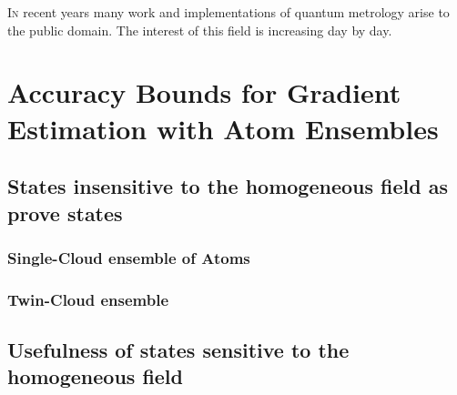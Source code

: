\documentclass[12pt, letterpaper, twoside]{article}
\begin{document}
\lettrine[lines=2, findent=3pt,nindent=0pt]{I}{n} recent years many work and
implementations of quantum metrology arise to the public domain.
The interest of this field is increasing day by day.

\cleardoublepage
\vspace*{100pt}
\section{Accuracy Bounds for Gradient Estimation with Atom Ensembles}
\vspace{50pt}

\subsection{States insensitive to the homogeneous field as prove states}

\subsubsection{Single-Cloud ensemble of Atoms}

\subsubsection{Twin-Cloud ensemble}

\subsection{Usefulness of states sensitive to the homogeneous field}
\end{document}
